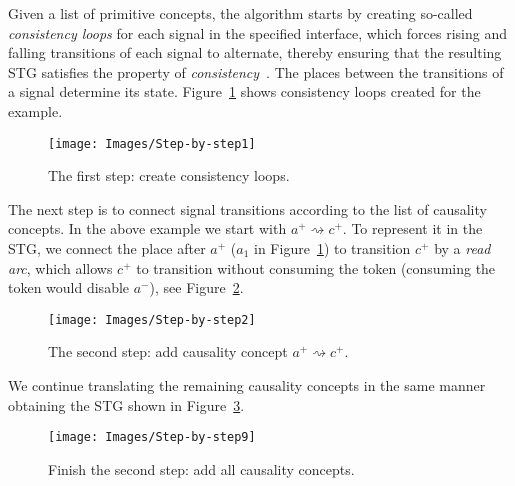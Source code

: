 \documentclass[british, journal]{IEEEtran}
\begin{document}
Given a list of primitive concepts, the algorithm starts by creating so-called
\emph{consistency loops} for each signal in the specified interface, which forces rising
and falling transitions of each signal to alternate, thereby ensuring that the resulting
STG satisfies the property of \emph{consistency}~\cite{Cortadella}.
The places between the transitions of a signal determine its state.
Figure~\ref{fig:step-by-step1} shows consistency loops created for the example.
\vspace{-2mm}
\begin{figure}[h]
\begin{centering}
\texttt{[image: Images/Step-by-step1]}
\par
\protect\caption{\label{fig:step-by-step1}The first step: create consistency loops.}
\vspace{-2mm}
\end{centering}
\end{figure}

The next step is to connect signal transitions according to the list of causality
concepts. In the above example we start with $a^{+}\rightsquigarrow c^{+}$.
To represent it in the STG, we connect the place after $a^{+}$ ($a_1$ in
Figure~\ref{fig:step-by-step1}) to transition $c^{+}$ by a \emph{read arc},
which allows $c^{+}$ to transition without consuming the token (consuming
the token would disable $a^{-}$), see Figure~\ref{fig:step-by-step2}.

\vspace{-2mm}
\begin{figure}[h]
\begin{centering}
\texttt{[image: Images/Step-by-step2]}
\par
\protect\caption{\label{fig:step-by-step2}The second step: add causality concept $a^{+}\rightsquigarrow c^{+}$.}
\vspace{-2mm}
\end{centering}
\end{figure}

We continue translating the remaining causality concepts in the same manner
obtaining the STG shown in Figure~\ref{fig:step-by-step9}.

\vspace{-2mm}
\begin{figure}[h]
\begin{centering}
\texttt{[image: Images/Step-by-step9]}
\par
\protect\caption{\label{fig:step-by-step9}Finish the second step: add all causality concepts.}
\vspace{-2mm}
\par\end{centering}
\end{figure}
\end{document}
